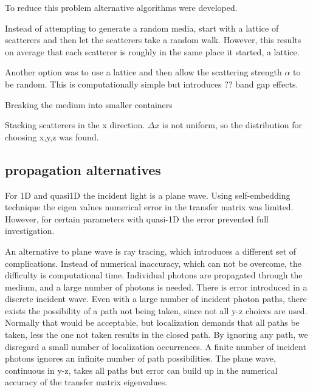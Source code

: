 To reduce this problem alternative algorithms were developed.

Instead of attempting to generate a random media, start with a 
lattice of scatterers and then let the scatterers take a random
walk.  However, this results on average that each scatterer is roughly
in the same place it started, a lattice.

Another option was to use a lattice and then allow the scattering
strength $\alpha$ to be random.  This is computationally simple but
introduces ?? band gap effects.

Breaking the medium into smaller containers

Stacking scatterers in the x direction. $\Delta x$ is not uniform, so
the distribution for choosing x,y,z was found.

\newpage
\subsection {propagation alternatives}
For 1D and quasi1D the incident light is a plane wave.  Using self-embedding
technique the eigen values numerical error in the transfer matrix was limited.
However, for certain parameters with quasi-1D the error prevented full investigation.

An alternative to plane wave is ray tracing, which introduces a different set
of complications. Instead of numerical inaccuracy, which can not be overcome, the 
difficulty is computational time. Individual photons are propagated through the 
medium, and a large number of photons is needed. There is error introduced in 
a discrete incident wave.  Even with a large number of incident photon paths, 
there exists the possibility of a path not being taken, since not all y-z choices 
are used.  Normally that would be acceptable, but localization demands that all 
paths be taken, less the one not taken results in the closed path.  By 
ignoring any path, we disregard a small number of localization occurrences.  
A finite number of incident photons ignores an infinite number of path possibilities.
The plane wave, continuous in y-z, takes all paths but error can build up in
the numerical accuracy of the transfer matrix eigenvalues.


